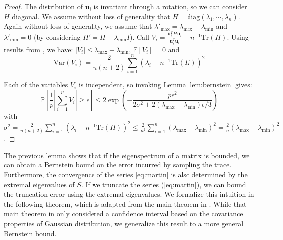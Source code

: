\begin{proof} The distribution of $\mathbf{u}_{i}$ is invariant
through a rotation, so we can consider $H$ diagonal. We assume without
loss of generality that $H=\text{diag}\left(\lambda_{1},\cdots,\lambda_{n}\right)$.
Again without loss of generality, we assume that $\lambda'_{\max}=\lambda_{\max}-\lambda_{\min}$
and $\lambda'_{\min}=0$ (by considering $H'=H-\lambda_{\min}I$).
Call $V_{i}=\frac{\mathbf{u}_{i}^{T}H\mathbf{u}_{i}}{\mathbf{u}_{i}^{T}\mathbf{u}_{i}}-n^{-1}\text{Tr}\left(H\right)$.
Using results from \cite{Barry1999}, we have: $\left|V_{i}\right|\leq\lambda_{\max}-\lambda_{\min}$,
$\mathbb{E}\left[V_{i}\right]=0$ and 
\[
\text{Var}\left(V_{i}\right)=\frac{2}{n(n+2)}\sum_{i=1}^{n}\left(\lambda_{i}-n^{-1}\text{Tr}\left(H\right)\right)^{2}
\]


Each of the variables $V_{i}$ is independent, %
so invoking Lemma \ref{lem:bernstein} gives: 
\[
\mathbb{P}\left[\frac{1}{p}\left|\sum_{i=1}^{p}V_{i}\right|\geq\epsilon\right]\leq2\exp\left(-\frac{p\epsilon^{2}}{2\sigma^{2}+2\left(\lambda_{\max}-\lambda_{\min}\right)\epsilon/3}\right)
\]
with $\sigma^{2}=\frac{2}{n(n+2)}\sum_{i=1}^{n}\left(\lambda_{i}-n^{-1}\text{Tr}\left(H\right)\right)^{2}\leq\frac{2}{n^{2}}\sum_{i=1}^{n}\left(\lambda_{\max}-\lambda_{\min}\right)^{2}=\frac{2}{n}\left(\lambda_{\max}-\lambda_{\min}\right)^{2}$.
\end{proof}

The previous lemma shows that if the eigenspectrum of a matrix is
bounded, we can obtain a Bernstein bound on the error incurred by
sampling the trace. Furthermore, the convergence of the series \ref{eq:martin}
is also determined by the extremal eigenvalues of $S$. If we truncate
the series (\ref{eq:martin}), we can bound the truncation error using
the extremal eigenvalues. We formalize this intuition in the following
theorem, which is adapted from the main theorem in \cite{Barry1999}.
While that main theorem in \cite{Barry1999} only considered a confidence
interval based on the covariance properties of Gaussian distribution,
we generalize this result to a more general Bernstein bound.

